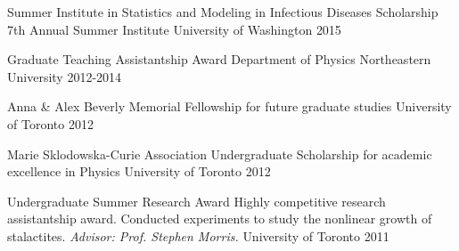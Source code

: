 
\begin{cvhonors}


  \cvhonorsecond
    {Summer Institute in Statistics and Modeling in Infectious Diseases Scholarship} %
    {\newline 7th Annual Summer Institute} %
    {University of Washington} %
    {2015} %


  \cvhonorsecond
    {Graduate Teaching Assistantship Award} %
    {Department of Physics} %
    {Northeastern University} %
    {2012-2014} %

  \cvhonorsecond
    {Anna \& Alex Beverly Memorial Fellowship} %
    {for future graduate studies} %
    {University of Toronto} %
    {2012} %

  \cvhonorsecond
    {Marie Sklodowska-Curie Association Undergraduate Scholarship} %
    {for academic excellence in Physics} %
    {University of Toronto} %
    {2012} %

  \cvhonorsecond
    {Undergraduate Summer Research Award} %
    {Highly competitive research assistantship award. Conducted experiments to study the nonlinear growth of stalactites. \textit{Advisor: Prof. Stephen Morris.}} %
    {University of Toronto} %
    {2011} %


\end{cvhonors}
